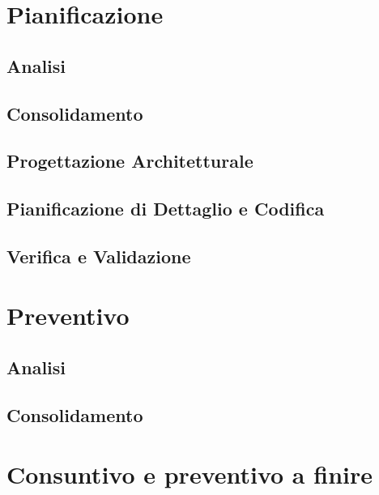 \documentclass[a4paper, oneside, openany, dvipsnames, table]{article}
\begin{document}
\section{Pianificazione}
	
	\subsection{Analisi}
			
	\subsection{Consolidamento}
		
	\subsection{Progettazione Architetturale}
		
	\subsection{Pianificazione di Dettaglio e Codifica}
		
	\subsection{Verifica e Validazione}
		
\newpage
\section{Preventivo}
%	
	\subsection{Analisi}
	    
	\newpage	
	\subsection{Consolidamento}
	    
	\newpage
%	    
	\newpage
%	    
	\newpage
%	    
	
\newpage
\section{Consuntivo e preventivo a finire}
\end{document}
